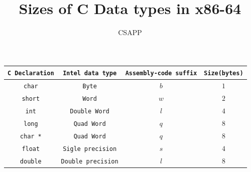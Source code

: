 \documentclass{article}
\title{Sizes of C Data types in x86-64}
\author{CSAPP}
\begin{document}
    \maketitle

    \begin{flushleft}
        \begin{tabular}{cccc}
            \toprule
            \texttt{C Declaration} & \texttt{Intel data type} & \texttt{Assembly-code suffix} & \texttt{Size{(bytes)}}\\
            \midrule
            \texttt{char}    & \texttt{Byte}          & $b$   & $1$\\
            \texttt{short}   & \texttt{Word}          & $w$   & $2$\\
            \texttt{int}     & \texttt{Double Word}   & $l$   & $4$\\
            \texttt{long}    & \texttt{Quad Word}     & $q$   & $8$\\
            \texttt{char *}  & \texttt{Quad Word}            & $q$   & $8$\\
            \texttt{float}   & \texttt{Sigle precision}      & $s$   & $4$\\
            \texttt{double}  & \texttt{Double precision}     & $l$   & $8$\\
            \bottomrule
        \end{tabular}
    \end{flushleft}
\end{document}
